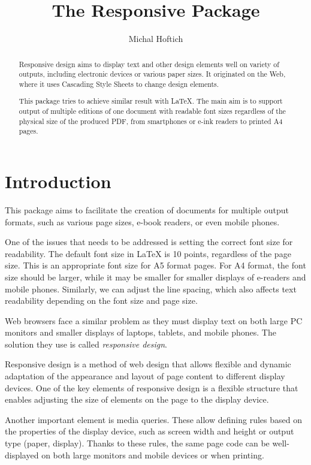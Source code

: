 \documentclass{ltxdoc}
\title{The Responsive Package}
\author{Michal Hoftich\authormail{michal.h21@gmail.com}}
\begin{document}
\maketitle
\begin{abstract}
Responsive design aims to display text and other design elements well on
variety of outputs, including electronic devices or various paper sizes.
It originated on the Web, where it uses Cascading Style Sheets to change 
design elements. 

This package tries to achieve similar result with \LaTeX. The main aim is to 
support output of multiple editions of one document with 
readable font sizes regardless of the physical size of the produced PDF,
from smartphones or e-ink readers to printed A4 pages.
\end{abstract}

\clearpage

\tableofcontents

\section{Introduction}

This package aims to facilitate the creation of documents for multiple output
formats, such as various page sizes, e-book readers, or even mobile phones.

One of the issues that needs to be addressed is setting the correct font size
for readability. The default font size in LaTeX is 10 points, regardless of the
page size. This is an appropriate font size for A5 format pages. For A4 format,
the font size should be larger, while it may be smaller for smaller displays of
e-readers and mobile phones. Similarly, we can adjust the line spacing, which
also affects text readability depending on the font size and page size.

Web browsers face a similar problem as they must display text on both large PC
monitors and smaller displays of laptops, tablets, and mobile phones. The
solution they use is called \textit{responsive design}.

Responsive design is a method of web design that allows flexible and dynamic
adaptation of the appearance and layout of page content to different display
devices. One of the key elements of responsive design is a flexible structure
that enables adjusting the size of elements on the page to the display device.

Another important element is media queries. These allow defining rules based on
the properties of the display device, such as screen width and height or output
type (paper, display). Thanks to these rules, the same page code can be
well-displayed on both large monitors and mobile devices or when printing. 
\end{document}
